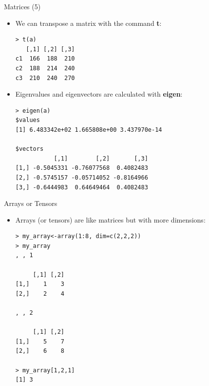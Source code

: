 \documentclass[handout]{beamer}
\begin{document}
\begin{frame}[fragile]{Matrices (5)}
\scriptsize{
\begin{itemize}
\item We can transpose a matrix with the command \textbf{t}:
 \begin{verbatim}
> t(a)
   [,1] [,2] [,3]
c1  166  188  210
c2  188  214  240
c3  210  240  270
\end{verbatim}
\item Eigenvalues and eigenvectors are calculated with \textbf{eigen}:
\begin{verbatim}
> eigen(a)
$values
[1] 6.483342e+02 1.665808e+00 3.437970e-14

$vectors
           [,1]        [,2]       [,3]
[1,] -0.5045331 -0.76077568  0.4082483
[2,] -0.5745157 -0.05714052 -0.8164966
[3,] -0.6444983  0.64649464  0.4082483
 \end{verbatim}

\end{itemize}


 
}

\end{frame}

\begin{frame}[fragile]{Arrays or Tensors}
\scriptsize{
\begin{itemize}
 \item Arrays (or tensors) are like matrices but with more dimensions:
 \begin{verbatim}
> my_array<-array(1:8, dim=c(2,2,2))
> my_array
, , 1

     [,1] [,2]
[1,]    1    3
[2,]    2    4

, , 2

     [,1] [,2]
[1,]    5    7
[2,]    6    8

> my_array[1,2,1]
[1] 3
 \end{verbatim}

\end{itemize}


}
\end{frame}
\end{document}
